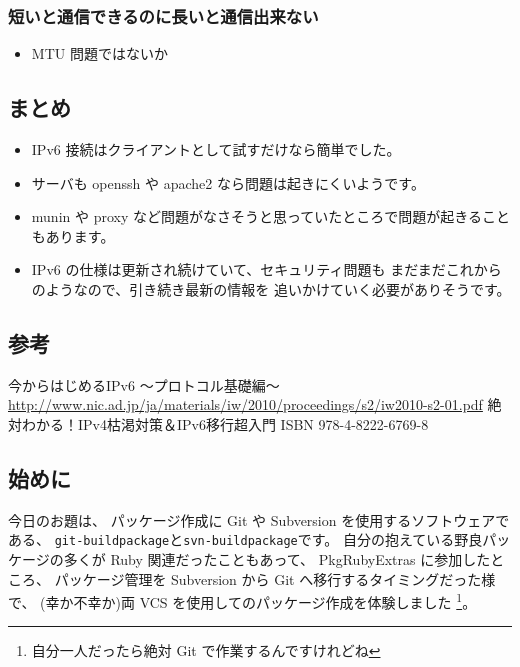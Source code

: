 \documentclass[mingoth,a4paper]{jsarticle}
\begin{document}
\subsubsection{短いと通信できるのに長いと通信出来ない}

\begin{itemize}
\item MTU 問題ではないか
\end{itemize}
\subsection{まとめ}

\begin{itemize}
\item IPv6 接続はクライアントとして試すだけなら簡単でした。
\item サーバも openssh や apache2 なら問題は起きにくいようです。
\item munin や proxy など問題がなさそうと思っていたところで問題が起きることもあります。
\item IPv6 の仕様は更新され続けていて、セキュリティ問題も
  まだまだこれからのようなので、引き続き最新の情報を
  追いかけていく必要がありそうです。
\end{itemize}
\subsection{参考}

\begin{thebibliography}{0}
  今からはじめるIPv6 〜プロトコル基礎編〜 \url{http://www.nic.ad.jp/ja/materials/iw/2010/proceedings/s2/iw2010-s2-01.pdf}
  絶対わかる！IPv4枯渇対策＆IPv6移行超入門 ISBN 978-4-8222-6769-8
\end{thebibliography}


\subsection{始めに}

今日のお題は、
パッケージ作成に Git や Subversion を使用するソフトウェアである、
{\tt{git-buildpackage}}と{\tt{svn-buildpackage}}です。
自分の抱えている野良パッケージの多くが Ruby 関連だったこともあって、
PkgRubyExtras に参加したところ、
パッケージ管理を Subversion から Git へ移行するタイミングだった様で、
(幸か不幸か)両 VCS を使用してのパッケージ作成を体験しました%
\footnote{自分一人だったら絶対 Git で作業するんですけれどね}。
\end{document}
